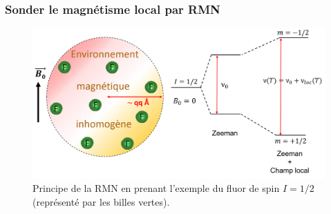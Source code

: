 \subsubsection{Sonder le magnétisme local par RMN}
\begin{figure}[!bht]
\centering
\includegraphics[scale=0.4]{Fig5.png}
\caption{\label{fig:RMN}Principe de la RMN en prenant l'exemple du fluor de spin $I=1/2$ (représenté par les billes vertes).}
\end{figure}

